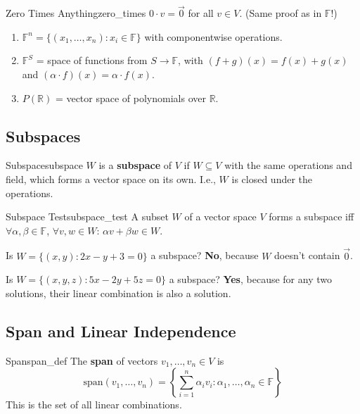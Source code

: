 \documentclass[11pt, letterpaper, openany]{book}
\begin{document}
\begin{lem}{Zero Times Anything}{zero_times}
$0 \cdot v = \vec{0}$ for all $v \in V$. (Same proof as in $\mathbb{F}$!)
\end{lem}

\begin{example}
\begin{enumerate}
    \item $\mathbb{F}^n = \{(x_1, \ldots, x_n) : x_i \in \mathbb{F}\}$ with componentwise operations.
    \item $\mathbb{F}^S$ = space of functions from $S \to \mathbb{F}$, with $(f+g)(x) = f(x) + g(x)$ and $(\alpha \cdot f)(x) = \alpha \cdot f(x)$.
    \item $P(\mathbb{R})$ = vector space of polynomials over $\mathbb{R}$.
\end{enumerate}
\end{example}

\subsection{Subspaces}

\begin{defn}{Subspace}{subspace}
$W$ is a \textbf{subspace} of $V$ if $W \subseteq V$ with the same operations and field, which forms a vector space on its own. I.e., $W$ is closed under the operations.
\end{defn}

\begin{lem}{Subspace Test}{subspace_test}
A subset $W$ of a vector space $V$ forms a subspace iff $\forall \alpha, \beta \in \mathbb{F}$, $\forall v, w \in W$: $\alpha v + \beta w \in W$.
\end{lem}

\begin{example}
Is $W = \{(x,y) : 2x - y + 3 = 0\}$ a subspace? \textbf{No}, because $W$ doesn't contain $\vec{0}$.

Is $W = \{(x,y,z) : 5x - 2y + 5z = 0\}$ a subspace? \textbf{Yes}, because for any two solutions, their linear combination is also a solution.
\end{example}

\subsection{Span and Linear Independence}

\begin{defn}{Span}{span_def}
The \textbf{span} of vectors $v_1, \ldots, v_n \in V$ is
\[\text{span}(v_1, \ldots, v_n) = \left\{\sum_{i=1}^n \alpha_i v_i : \alpha_1, \ldots, \alpha_n \in \mathbb{F}\right\}\]
This is the set of all linear combinations.
\end{defn}
\end{document}
